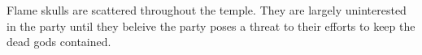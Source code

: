 Flame skulls are scattered throughout the temple.
They are largely uninterested in the party until they beleive the party poses a threat to their efforts to keep the dead gods contained.